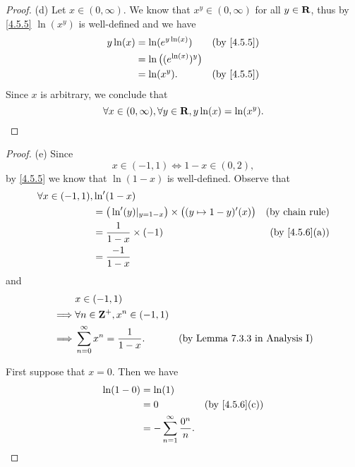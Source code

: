 \begin{proof}{(d)}
  Let \(x \in (0, \infty)\).
  We know that \(x^y \in (0, \infty)\) for all \(y \in \mathbf{R}\), thus by \cref{4.5.5} \(\ln(x^y)\) is well-defined and we have
  \begin{align*}
    y \ln(x) & = \ln(e^{y \ln(x)})             & \text{(by \cref{4.5.5})} \\
             & = \ln\big((e^{\ln(x)})^{y}\big)                            \\
             & = \ln(x^y).                     & \text{(by \cref{4.5.5})}
  \end{align*}
  Since \(x\) is arbitrary, we conclude that
  \[
    \forall x \in (0, \infty), \forall y \in \mathbf{R}, y \ln(x) = \ln(x^y).
  \]
\end{proof}

\begin{proof}{(e)}
  Since
  \[
    x \in (-1, 1) \iff 1 - x \in (0, 2),
  \]
  by \cref{4.5.5} we know that \(\ln(1 - x)\) is well-defined.
  Observe that
  \begin{align*}
    \forall x \in (-1, 1), & \ln'(1 - x)                                                                                           \\
                           & = \big(\ln'(y)|_{y = 1 - x}\big) \times \big((y \mapsto 1 - y)'(x)\big) & \text{(by chain rule)}      \\
                           & = \frac{1}{1 - x} \times (-1)                                           & \text{(by \cref{4.5.6}(a))} \\
                           & = \frac{-1}{1 - x}
  \end{align*}
  and
  \begin{align*}
             & x \in (-1, 1)                                                                      \\
    \implies & \forall n \in \mathbf{Z}^+, x^n \in (-1, 1)                                                \\
    \implies & \sum_{n = 0}^\infty x^n = \frac{1}{1 - x}. & \text{(by Lemma 7.3.3 in Analysis I)}
  \end{align*}

  First suppose that \(x = 0\).
  Then we have
  \begin{align*}
    \ln(1 - 0) & = \ln(1)                                                             \\
               & = 0                                    & \text{(by \cref{4.5.6}(c))} \\
               & = - \sum_{n = 1}^\infty \frac{0^n}{n}.
  \end{align*}


\end{proof}
